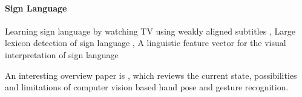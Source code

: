 \paragraph{Sign Language}
Learning sign language by watching TV using weakly aligned subtitles \cite{Buehler2009},
Large lexicon detection of sign language \cite{Cooper2007},
A linguistic feature vector for the visual interpretation of sign language \cite{RichardBowden2004}




An interesting overview paper is \cite{Erol2007}, which reviews the current state, possibilities and limitations of computer vision based hand pose and gesture recognition.



